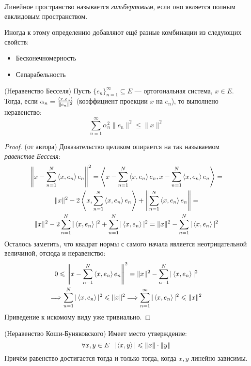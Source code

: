 \begin{definition}
	Линейное пространство называется \textit{гильбертовым}, если оно является полным евклидовым пространством.
\end{definition}

\begin{note}
	Иногда к этому определению добавляют ещё разные комбинации из следующих свойств:
	\begin{itemize}
		\item Бесконечномерность
		
		\item Сепарабельность
	\end{itemize}
\end{note}

\begin{reminder} (Неравенство Бесселя)
	Пусть $\{e_n\}_{n = 1}^\infty \subseteq E$ --- ортогональная система, $x \in E$. Тогда, если $\alpha_n = \frac{\left\langle x, e_n\right\rangle}{\|e_n\|^2}$ (коэффициент проекции $x$ на $e_n$), то выполнено неравенство:
	\[
		\sum_{n = 1}^\infty \alpha_n^2\|e_n\|^2 \le \|x\|^2
	\]
\end{reminder}

\begin{proof} (от автора)
	Доказательство целиком опирается на так называемом \textit{равенстве Бесселя}:
	\begin{multline*}
		\left\|x - \sum_{n = 1}^N \left\langle x, e_n\right\rangle e_n\right\|^2 = \left\langle x - \sum_{n = 1}^N \left\langle x, e_n\right\rangle e_n, x - \sum_{n = 1}^N \left\langle x, e_n\right\rangle e_n\right\rangle =
		\\
		\|x\|^2 - 2\left\langle x, \sum_{n = 1}^N \left\langle x, e_n\right\rangle e_n\right\rangle + \left\|\sum_{n = 1}^N \left\langle x, e_n\right\rangle e_n\right\| =
		\\
		\|x\|^2 - 2\sum_{n = 1}^N |\left\langle x, e_n\right\rangle|^2 + \sum_{n = 1}^N |\left\langle x, e_n\right\rangle|^2 = \|x\|^2 - \sum_{n = 1}^N |\left\langle x, e_n\right\rangle|^2
	\end{multline*}
	Осталось заметить, что квадрат нормы с самого начала является неотрицательной величиной, отсюда и неравенство:
	\begin{multline*}
		0 \leqslant \left\|x - \sum_{n = 1}^N \left\langle x, e_n\right\rangle e_n\right\|^2 = \|x\|^2 - \sum_{n = 1}^N |\left\langle x, e_n\right\rangle|^2
		\\
		\Longrightarrow \sum_{n = 1}^N |\left\langle x, e_n\right\rangle|^2 \leqslant \|x\|^2 \Longrightarrow \sum_{n = 1}^\infty |\left\langle x, e_n\right\rangle|^2 \leqslant \|x\|^2
	\end{multline*}
	Приведение к искомому виду уже тривиально.
\end{proof}

\begin{proposition} (Неравенство Коши-Буняковского)
	Имеет место утверждение:
	\[
		\forall x, y \in E\ \ |\left\langle x, y\right\rangle| \leqslant \|x\| \cdot \|y\|
	\]
	Причём равенство достигается тогда и только тогда, когда $x, y$ линейно зависимы.
\end{proposition}

